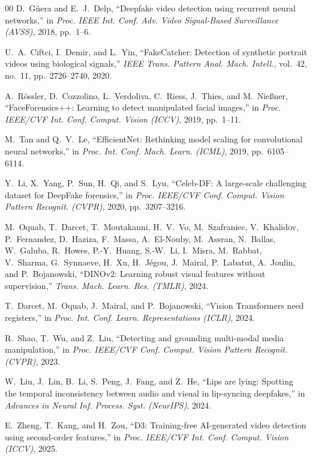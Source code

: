 \documentclass[conference]{IEEEtran}
\begin{document}
\begin{thebibliography}{00}
D.~G\"{u}era and E.~J.~Delp, ``Deepfake video detection using recurrent neural networks,'' in \emph{Proc. IEEE Int. Conf. Adv. Video Signal-Based Surveillance (AVSS)}, 2018, pp.~1--6.

U.~A.~Ciftci, I.~Demir, and L.~Yin, ``{FakeCatcher}: Detection of synthetic portrait videos using biological signals,'' \emph{IEEE Trans. Pattern Anal. Mach. Intell.}, vol.~42, no.~11, pp.~2726--2740, 2020.

A.~R\"{o}ssler, D.~Cozzolino, L.~Verdoliva, C.~Riess, J.~Thies, and M.~Nie{\ss}ner, ``{FaceForensics++}: Learning to detect manipulated facial images,'' in \emph{Proc. IEEE/CVF Int. Conf. Comput. Vision (ICCV)}, 2019, pp.~1--11.

M.~Tan and Q.~V.~Le, ``{EfficientNet}: Rethinking model scaling for convolutional neural networks,'' in \emph{Proc. Int. Conf. Mach. Learn. (ICML)}, 2019, pp.~6105--6114.

Y.~Li, X.~Yang, P.~Sun, H.~Qi, and S.~Lyu, ``{Celeb-DF}: A large-scale challenging dataset for {DeepFake} forensics,'' in \emph{Proc. IEEE/CVF Conf. Comput. Vision Pattern Recognit. (CVPR)}, 2020, pp.~3207--3216.

M.~Oquab, T.~Darcet, T.~Moutakanni, H.~V.~Vo, M.~Szafraniec, V.~Khalidov, P.~Fernandez, D.~Haziza, F.~Massa, A.~El-Nouby, M.~Assran, N.~Ballas, W.~Galuba, R.~Howes, P.-Y.~Huang, S.-W.~Li, I.~Misra, M.~Rabbat, V.~Sharma, G.~Synnaeve, H.~Xu, H.~J\'{e}gou, J.~Mairal, P.~Labatut, A.~Joulin, and P.~Bojanowski, ``{DINOv2}: Learning robust visual features without supervision,'' \emph{Trans. Mach. Learn. Res. (TMLR)}, 2024.

T.~Darcet, M.~Oquab, J.~Mairal, and P.~Bojanowski, ``Vision {Transformers} need registers,'' in \emph{Proc. Int. Conf. Learn. Representations (ICLR)}, 2024.

R.~Shao, T.~Wu, and Z.~Liu, ``Detecting and grounding multi-modal media manipulation,'' in \emph{Proc. IEEE/CVF Conf. Comput. Vision Pattern Recognit. (CVPR)}, 2023.

W.~Liu, J.~Lin, B.~Li, S.~Peng, J.~Fang, and Z.~He, ``Lips are lying: Spotting the temporal inconsistency between audio and visual in lip-syncing deepfakes,'' in \emph{Advances in Neural Inf. Process. Syst. (NeurIPS)}, 2024.

E.~Zheng, T.~Kang, and H.~Zou, ``{D3}: Training-free {AI}-generated video detection using second-order features,'' in \emph{Proc. IEEE/CVF Int. Conf. Comput. Vision (ICCV)}, 2025.


\end{thebibliography}
\end{document}
